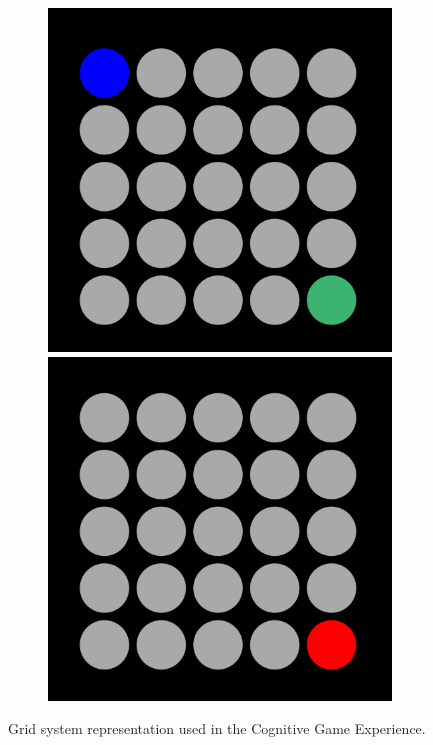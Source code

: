 \documentclass[journal]{IEEEtran}
\begin{document}
{\begin{figure}[h!]
\begin{subfigure}{0.5\textwidth}
\centering 
\includegraphics[scale=0.2]{Images/grid_initial_state.png}
\includegraphics[scale=0.2]{Images/grid_end_state.png}
\end{subfigure}
\centering 
\caption{Grid system representation used in the Cognitive Game Experience.}
\label{fig:game_representation}
\end{figure}

}
\end{document}
